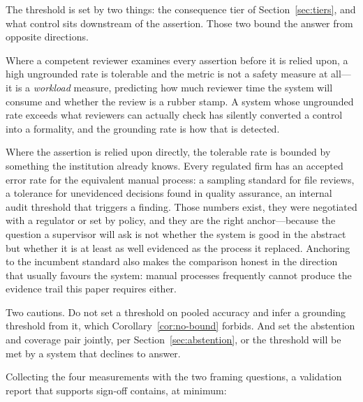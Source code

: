 The threshold is set by two things: the consequence tier of
Section~\ref{sec:tiers}, and what control sits downstream of the assertion. Those two
bound the answer from opposite directions.

Where a competent reviewer examines every assertion before it is relied upon, a high
ungrounded rate is tolerable and the metric is not a safety measure at all---it is a
\emph{workload} measure, predicting how much reviewer time the system will consume and
whether the review is a rubber stamp. A system whose ungrounded rate exceeds what
reviewers can actually check has silently converted a control into a formality, and the
grounding rate is how that is detected.

Where the assertion is relied upon directly, the tolerable rate is bounded by something
the institution already knows. Every regulated firm has an accepted error rate for the
equivalent manual process: a sampling standard for file reviews, a tolerance for
unevidenced decisions found in quality assurance, an internal audit threshold that
triggers a finding. Those numbers exist, they were negotiated with a regulator or set by
policy, and they are the right anchor---because the question a supervisor will ask is not
whether the system is good in the abstract but whether it is at least as well evidenced
as the process it replaced. Anchoring to the incumbent standard also makes the comparison
honest in the direction that usually favours the system: manual processes frequently
cannot produce the evidence trail this paper requires either.

Two cautions. Do not set a threshold on pooled accuracy and infer a grounding threshold
from it, which Corollary~\ref{cor:no-bound} forbids. And set the abstention and coverage
pair jointly, per Section~\ref{sec:abstention}, or the threshold will be met by a system
that declines to answer.

Collecting the four measurements with the two framing questions, a validation report
that supports sign-off contains, at minimum:

